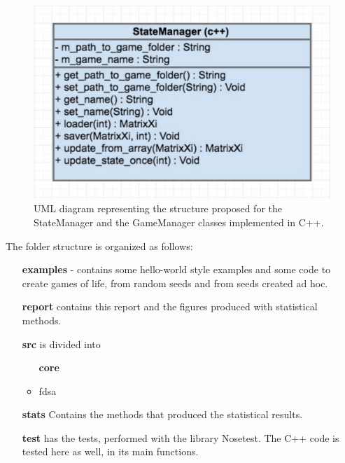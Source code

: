 \documentclass[11pt, twoside]{article}
\begin{document}
\begin{figure}[htbp]
	\centering
	\includegraphics[scale=0.45]{figures/uml_cpp.pdf}
	\caption{UML diagram representing the structure proposed for the StateManager and the GameManager classes implemented in C++.}
	\label{fig:uml_cpp}
\end{figure}

\noindent
The folder structure is organized as follows:
\begin{itemize}
	\item[{\bf examples}] - contains some hello-world style examples and some code to create games of life, from random seeds and from seeds created ad hoc.
	\item[{\bf report}] contains this report and the figures produced with statistical methods.
	\item[{\bf src}] is divided into
	\begin{itemize}
		\item[{\bf core}]
		\item fdsa
	\end{itemize}
	\item[{\bf stats}] Contains the methods that produced the statistical results.
	\item[{\bf test}] has the tests, performed with the library Nosetest. The C++ code is tested here as well, in its main functions.
\end{itemize}


\end{document}
